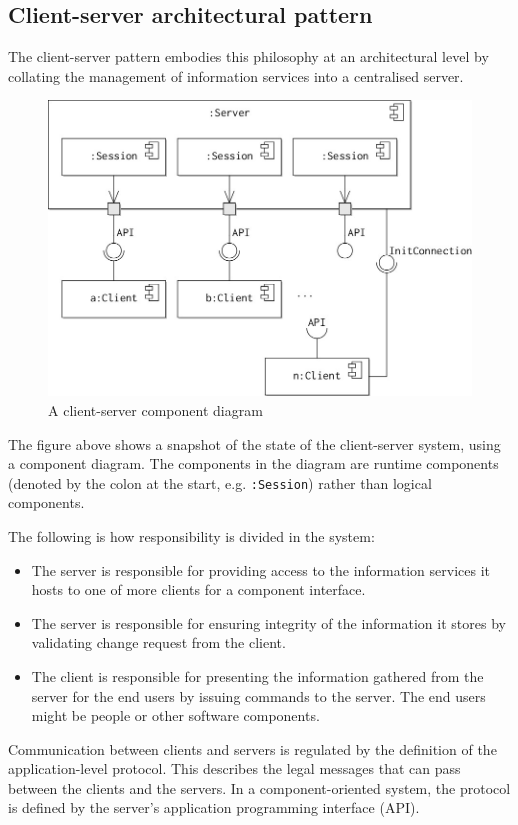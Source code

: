 \documentclass[a4paper, openany]{memoir}
\begin{document}
\subsection{Client-server architectural pattern}
The client-server pattern embodies this philosophy at an architectural level by collating the management of information services into a centralised server.
\begin{figure}[H]
    \centering
    \includegraphics[scale=0.45]{src/14.4 Client server.png}
    \caption{A client-server component diagram}
\end{figure}
\noindent The figure above shows a snapshot of the state of the client-server system, using a component diagram. The components in the diagram are runtime components (denoted by the colon at the start, e.g. \texttt{:Session}) rather than logical components.

The following is how responsibility is divided in the system:
\begin{itemize}
    \item The server is responsible for providing access to the information services it hosts to one of more clients for a component interface.
    \item The server is responsible for ensuring integrity of the information it stores by validating change request from the client.
    \item The client is responsible for presenting the information gathered from the server for the end users by issuing commands to the server. The end users might be people or other software components.
\end{itemize}

Communication between clients and servers is regulated by the definition of the application-level protocol. This describes the legal messages that can pass between the clients and the servers.  In a component-oriented system, the protocol is defined by the server's application programming interface (API). 
\end{document}
